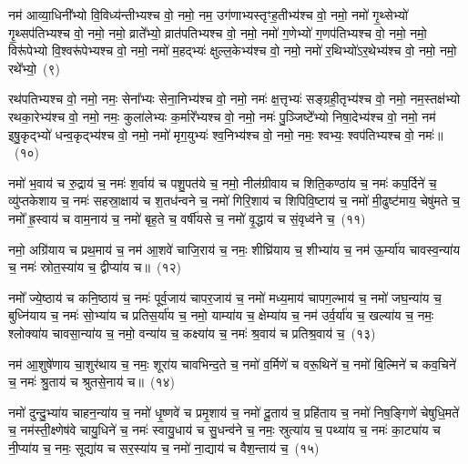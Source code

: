 {\anuvakamend[{कु॒लु॒ञ्चानां॒ पत॑ये॒ नमो॒ नमो\-ऽश्व॑पतिभ्य॒स्त्रीणि॑ च}]}%

नम॑ आव्या॒धिनी᳚भ्यो वि॒विध्य॑न्तीभ्यश्च वो॒ नमो॒ नम॒ उग॑णाभ्यस्तृꣳह॒तीभ्य॑श्च वो॒ नमो॒ नमो॑ गृ॒थ्सेभ्यो॑ गृ॒थ्सप॑तिभ्यश्च वो॒ नमो॒ नमो॒ व्राते᳚भ्यो॒ व्रात॑पतिभ्यश्च वो॒ नमो॒ नमो॑ ग॒णेभ्यो॑ ग॒णप॑तिभ्यश्च वो॒ नमो॒ नमो॒ विरू॑पेभ्यो वि॒श्वरू॑पेभ्यश्च वो॒ नमो॒ नमो॑ म॒हद्भ्यः॑ क्षुल्ल॒केभ्य॑श्च वो॒ नमो॒ नमो॑ र॒थिभ्यो॑\-ऽर॒थेभ्य॑श्च वो॒ नमो॒ नमो॒ रथे᳚भ्यो॒~(९)

रथ॑पतिभ्यश्च वो॒ नमो॒ नमः॒ सेना᳚भ्यः सेना॒निभ्य॑श्च वो॒ नमो॒ नमः॑ क्ष॒त्तृभ्यः॑ सङ्ग्रही॒तृभ्य॑श्च वो॒ नमो॒ नम॒स्तक्ष॑भ्यो रथका॒रेभ्य॑श्च वो॒ नमो॒ नमः॒ कुला॑लेभ्यः क॒र्मारे᳚भ्यश्च वो॒ नमो॒ नमः॑ पु॒ञ्जिष्टे᳚भ्यो निषा॒देभ्य॑श्च वो॒ नमो॒ नम॑ इषु॒कृद्भ्यो॑ धन्व॒कृद्भ्य॑श्च वो॒ नमो॒ नमो॑ मृग॒युभ्यः॑ श्व॒निभ्य॑श्च वो॒ नमो॒ नमः॒ श्वभ्यः॒ श्वप॑तिभ्यश्च वो॒ नमः॑॥~(१०)

{\anuvakamend[{रथे᳚भ्यः॒ श्वप॑तिभ्यश्च॒ द्वे च॑}]}%

नमो॑ भ॒वाय॑ च रु॒द्राय॑ च॒ नमः॑ श॒र्वाय॑ च पशु॒पत॑ये च॒ नमो॒ नील॑ग्रीवाय च शिति॒कण्ठा॑य च॒ नमः॑ कप॒र्दिने॑ च॒ व्यु॑प्तकेशाय च॒ नमः॑ सहस्रा॒क्षाय॑ च श॒तध॑न्वने च॒ नमो॑ गिरि॒शाय॑ च शिपिवि॒ष्टाय॑ च॒ नमो॑ मी॒ढुष्ट॑माय॒ चेषु॑मते च॒ नमो᳚ ह्र॒स्वाय॑ च वाम॒नाय॑ च॒ नमो॑ बृह॒ते च॒ वर्\mbox{}षी॑यसे च॒ नमो॑ वृ॒द्धाय॑ च सं॒वृध्व॑ने च॒~(११)

नमो॒ अग्रि॑याय च प्रथ॒माय॑ च॒ नम॑ आ॒शवे॑ चाजि॒राय॑ च॒ नमः॒ शीघ्रि॑याय च॒ शीभ्या॑य च॒ नम॑ ऊ॒र्म्या॑य चावस्व॒न्या॑य च॒ नमः॑ स्रोत॒स्या॑य च॒ द्वीप्या॑य च॥~(१२)

{\anuvakamend[{सं॒ वृध्व॑ने च॒ पञ्च॑विꣳशतिश्च}]}%

नमो᳚ ज्ये॒ष्ठाय॑ च कनि॒ष्ठाय॑ च॒ नमः॑ पूर्व॒जाय॑ चापर॒जाय॑ च॒ नमो॑ मध्य॒माय॑ चापग॒ल्भाय॑ च॒ नमो॑ जघ॒न्या॑य च॒ बुध्नि॑याय च॒ नमः॑ सो॒भ्या॑य च प्रतिस॒र्या॑य च॒ नमो॒ याम्या॑य च॒ क्षेम्या॑य च॒ नम॑ उर्व॒र्या॑य च॒ खल्या॑य च॒ नमः॒ श्लोक्या॑य चावसा॒न्या॑य च॒ नमो॒ वन्या॑य च॒ कक्ष्या॑य च॒ नमः॑ श्र॒वाय॑ च प्रतिश्र॒वाय॑ च॒~(१३)

नम॑ आ॒शुषे॑णाय चा॒शुर॑थाय च॒ नमः॒ शूरा॑य चावभिन्द॒ते च॒ नमो॑ व॒र्मिणे॑ च वरू॒थिने॑ च॒ नमो॑ बि॒ल्मिने॑ च कव॒चिने॑ च॒ नमः॑ श्रु॒ताय॑ च श्रुतसे॒नाय॑ च॥~(१४)

{\anuvakamend[{प्र॒ति॒श्र॒वाय॑ च॒ पञ्च॑विꣳशतिश्च}]}%

नमो॑ दुन्दु॒भ्या॑य चाहन॒न्या॑य च॒ नमो॑ धृ॒ष्णवे॑ च प्रमृ॒शाय॑ च॒ नमो॑ दू॒ताय॑ च॒ प्रहि॑ताय च॒ नमो॑ निष॒ङ्गिणे॑ चेषुधि॒मते॑ च॒ नम॑स्ती॒क्ष्णेष॑वे चायु॒धिने॑ च॒ नमः॑ स्वायु॒धाय॑ च सु॒धन्व॑ने च॒ नमः॒ स्रुत्या॑य च॒ पथ्या॑य च॒ नमः॑ का॒ट्या॑य च नी॒प्या॑य च॒ नमः॒ सूद्या॑य च सर॒स्या॑य च॒ नमो॑ ना॒द्याय॑ च वैश॒न्ताय॑ च॒~(१५)

